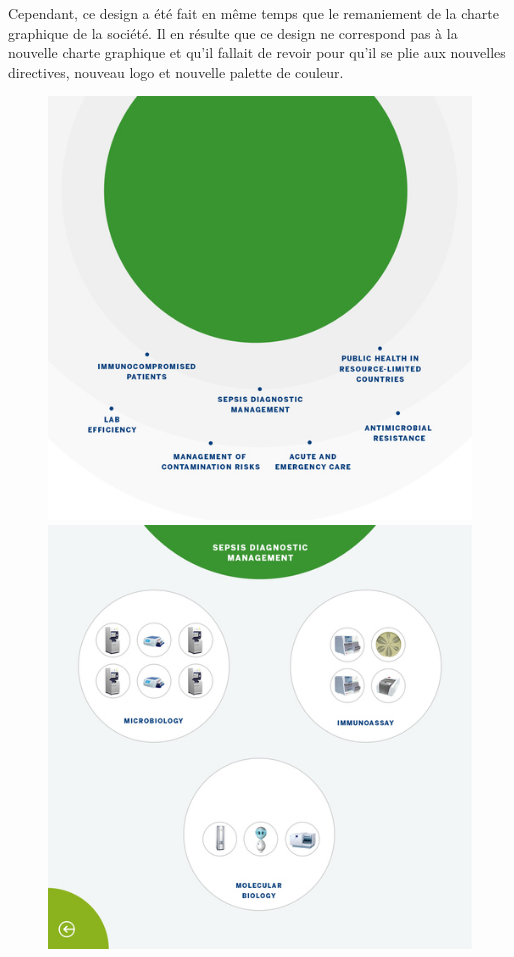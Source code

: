 \documentclass{article}
\begin{document}
Cependant, ce design a été fait en même temps que le remaniement de la charte graphique de la société.
Il en résulte que ce design ne correspond pas à la nouvelle charte graphique et qu'il fallait de revoir pour qu'il se plie aux nouvelles directives, nouveau logo et nouvelle palette de couleur.

\begin{figure}[h]
    \centering
    \includegraphics[scale=0.195]{resized-bmx-1-new.jpg}
    \includegraphics[scale=0.195]{resized-bmx-2-new.jpg}

\end{figure}
\end{document}
